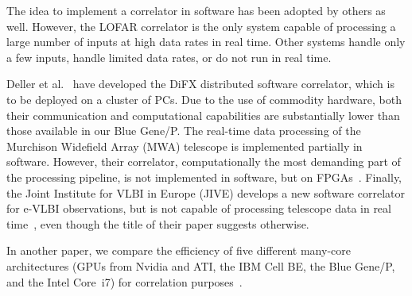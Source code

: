 \documentclass{sig-alternate}
\begin{document}
The idea to implement a correlator in software has been adopted by others as
well.
However, the LOFAR correlator is the only system capable of processing a large
number of inputs at high data rates in real time.
Other systems handle only a few inputs, handle limited data rates, or do not
run in real time.

Deller et al.~\cite{Deller:07} have developed the DiFX distributed
software correlator, which is to be deployed on a cluster of PCs.
Due to the use of commodity hardware, both their communication and
computational capabilities are substantially lower than those available in
our Blue Gene/P.
The real-time data processing of the Murchison Widefield Array (MWA) telescope
is implemented partially in software.
However, their correlator, computationally the most demanding part of the
processing pipeline, is not implemented in software, but on 
FPGAs~\cite{Ord:08}.
Finally, the Joint Institute for VLBI in Europe (JIVE) develops a new software
correlator for e-VLBI observations, but is not capable of processing telescope
data in real time~\cite{Kruithof:08}, even though the title of their paper suggests
otherwise.

In another paper, we compare the efficiency of five different many-core
architectures (GPUs from Nvidia and ATI, the IBM Cell BE, the Blue Gene/P,
and the Intel Core~i7) for correlation purposes~\cite{Nieuwpoort:09}.


\end{document}
